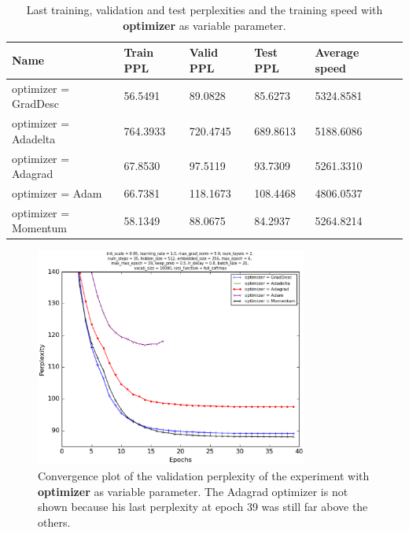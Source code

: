 \documentclass[10pt,a4paper,titlepage]{article}
\begin{document}
\begin{table}[H]
\centering
\caption{Last training, validation and test perplexities and the training speed with \textbf{optimizer} as variable parameter.}
\label{tab:exp8data}
\begin{tabular}{|l|l|l|l|l|l|}
\hline
{\small Name} & {\small Train PPL} & {\small Valid PPL} & {\small Test PPL} & {\small Average speed}\\ \hline
optimizer = GradDesc                          & 56.5491    & 89.0828    & 85.6273    & 5324.8581  \\ \hline
optimizer = Adadelta                          & 764.3933   & 720.4745   & 689.8613   & 5188.6086  \\ \hline
optimizer = Adagrad                           & 67.8530    & 97.5119    & 93.7309    & 5261.3310  \\ \hline
optimizer = Adam                              & 66.7381    & 118.1673   & 108.4468   & 4806.0537  \\ \hline
optimizer = Momentum                          & 58.1349    & 88.0675    & 84.2937    & 5264.8214  \\ \hline
\end{tabular}
\end{table}

\begin{figure}[H]
	\begin{center}
		\includegraphics[width=0.80\textwidth]{Figures/optimizerperf.eps}
		\caption{Convergence plot of the validation perplexity of the experiment with \textbf{optimizer} as variable parameter. The Adagrad optimizer is not shown because his last perplexity at epoch 39 was still far above the others.}
		\label{fig:exp8perf}
	\end{center}	
\end{figure}
\end{document}
